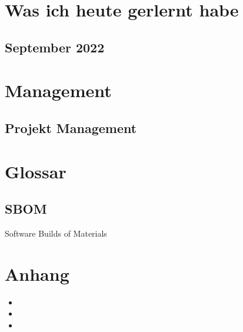 \documentclass[letterpaper,10pt,ngerman]{sphinxmanual}
\begin{document}
\sphinxstepscope


\chapter{Was ich heute gerlernt habe}
\label{\detokenize{wihgh/index:was-ich-heute-gerlernt-habe}}\label{\detokenize{wihgh/index::doc}}
\sphinxstepscope


\section{September 2022}
\label{\detokenize{wihgh/2022-09:september-2022}}\label{\detokenize{wihgh/2022-09::doc}}
\sphinxstepscope


\chapter{Management}
\label{\detokenize{projektmanagement/index:management}}\label{\detokenize{projektmanagement/index::doc}}
\sphinxstepscope


\section{Projekt Management}
\label{\detokenize{projektmanagement/projektmanagement:projekt-management}}\label{\detokenize{projektmanagement/projektmanagement::doc}}
\sphinxstepscope


\chapter{Glossar}
\label{\detokenize{glossar:glossar}}\label{\detokenize{glossar::doc}}

\section{SBOM}
\label{\detokenize{glossar:sbom}}
\sphinxAtStartPar
Software Builds of Materials


\chapter{Anhang}
\label{\detokenize{index:anhang}}\begin{itemize}
\item {} 
\sphinxAtStartPar
{}

\item {} 
\sphinxAtStartPar
{}

\item {} 
\sphinxAtStartPar
{}

\end{itemize}



\renewcommand{\indexname}{Stichwortverzeichnis}
\printindex
\end{document}
